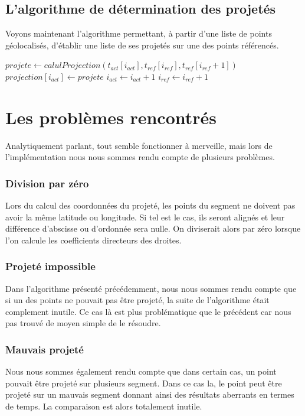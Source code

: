 \subsection{L'algorithme de détermination des projetés}
Voyons maintenant l'algorithme permettant, à partir d'une liste de points géolocalisés, d'établir une liste de ses projetés sur une des points référencés.
\begin{algorithmic}
	\State $projete \gets calulProjection(t_{act}[i_{act}],t_{ref}[i_{ref}],t_{ref}[i_{ref}+1])$
    	\State $projection[i_{act}]\gets projete$
    	\State $i_{act}\gets i_{act}+1$
   	\Else
   		\State $i_{ref}\gets i_{ref}+1$
    \EndIf

\EndWhile
\EndFunction
\end{algorithmic}

\section{Les problèmes rencontrés}
Analytiquement parlant, tout semble fonctionner à merveille, mais lors de l'implémentation nous nous sommes rendu compte de plusieurs problèmes. 

\subsubsection{Division par zéro}
Lors du calcul des coordonnées du projeté, les points du segment ne doivent pas avoir la même latitude ou longitude. Si tel est le cas, ils seront alignés et leur différence d'abscisse ou d'ordonnée sera nulle. On diviserait alors par zéro lorsque l'on calcule les coefficients directeurs des droites.

\subsubsection{Projeté impossible}
Dans l'algorithme présenté précédemment, nous nous sommes rendu compte que si un des points ne pouvait pas être projeté, la suite de l'algorithme était complement inutile. Ce cas là est plus problématique que le précédent car nous pas trouvé de moyen simple de le résoudre.

\subsubsection{Mauvais projeté}
Nous nous sommes également rendu compte que dans certain cas, un point pouvait être projeté sur plusieurs segment. Dans ce cas la, le point peut être projeté sur un mauvais segment donnant ainsi des résultats aberrants en termes de temps. La comparaison est alors totalement inutile.